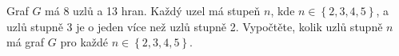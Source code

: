 Graf $G$ má 8 uzlů a 13 hran. Každý uzel má stupeň $n$, kde $n \in \left \{
2,3,4,5 \right \}$, a uzlů stupně 3 je o jeden více než uzlů stupně 2.
Vypočtěte, kolik uzlů stupně $n$ má graf $G$ pro každé $n \in \left \{ 2,3,4,5
\right \}$.

